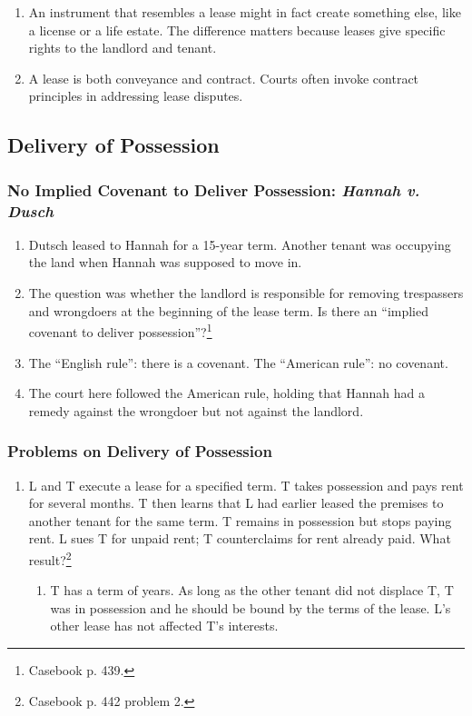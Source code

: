 \begin{enumerate}
    \item An instrument that resembles a lease might in fact create something 
    else, like a license or a life estate. The difference matters because 
    leases give specific rights to the landlord and tenant.
    \item A lease is both conveyance and contract. Courts often invoke 
    contract principles in addressing lease disputes.
\end{enumerate}

\subsection{Delivery of Possession}

\subsubsection{No Implied Covenant to Deliver Possession: \emph{Hannah v. 
Dusch}}

\begin{enumerate}
    \item Dutsch leased to Hannah for a 15-year term. Another tenant was 
    occupying the land when Hannah was supposed to move in.
    \item The question was whether the landlord is responsible for removing 
    trespassers and wrongdoers at the beginning of the lease term. Is there an 
    ``implied covenant to deliver possession''?\footnote{Casebook p. 439.}
    \item The ``English rule'': there is a covenant. The ``American rule'': no 
    covenant.
    \item The court here followed the American rule, holding that Hannah had a 
    remedy against the wrongdoer but not against the landlord.
\end{enumerate}

\subsubsection{Problems on Delivery of Possession}

\begin{enumerate}
    \item L and T execute a lease for a specified term. T takes possession and 
    pays rent for several months. T then learns that L had earlier leased the 
    premises to another tenant for the same term. T remains in possession but 
    stops paying rent. L sues T for unpaid rent; T counterclaims for rent 
    already paid. What result?\footnote{Casebook p. 442 problem 2.}
    \begin{enumerate}
        \item T has a term of years. As long as the other tenant did not 
        displace T, T was in possession and he should be bound by the terms of 
        the lease. L's other lease has not affected T's interests.
    \end{enumerate}
\end{enumerate}

